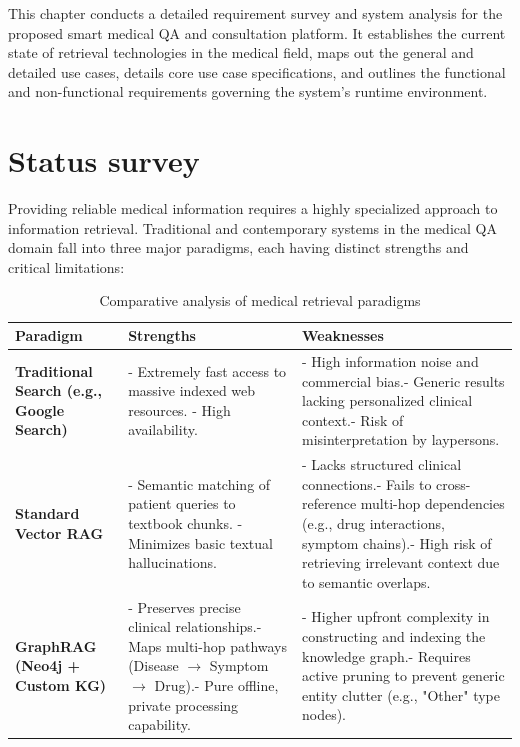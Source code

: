 \documentclass[../main.tex]{subfiles}
\begin{document}
This chapter conducts a detailed requirement survey and system analysis for the proposed smart medical QA and consultation platform. It establishes the current state of retrieval technologies in the medical field, maps out the general and detailed use cases, details core use case specifications, and outlines the functional and non-functional requirements governing the system's runtime environment.

\section{Status survey}
\label{section:2.1}
Providing reliable medical information requires a highly specialized approach to information retrieval. Traditional and contemporary systems in the medical QA domain fall into three major paradigms, each having distinct strengths and critical limitations:

\begin{table}[H]
\centering
\small
\setlength{\tabcolsep}{4pt}
\begin{tabular}{|p{2.8cm}|p{5.7cm}|p{5.7cm}|}
\hline
\textbf{Paradigm} & \textbf{Strengths} & \textbf{Weaknesses} \\ \hline
\textbf{Traditional Search (e.g., Google Search)} & - Extremely fast access to massive indexed web resources. \newline- High availability. & - High information noise and commercial bias.\newline- Generic results lacking personalized clinical context.\newline- Risk of misinterpretation by laypersons. \\ \hline
\textbf{Standard Vector RAG} & - Semantic matching of patient queries to textbook chunks. \newline- Minimizes basic textual hallucinations. & - Lacks structured clinical connections.\newline- Fails to cross-reference multi-hop dependencies (e.g., drug interactions, symptom chains).\newline- High risk of retrieving irrelevant context due to semantic overlaps. \\ \hline
\textbf{GraphRAG (Neo4j + Custom KG)} & - Preserves precise clinical relationships.\newline- Maps multi-hop pathways (Disease $\rightarrow$ Symptom $\rightarrow$ Drug).\newline- Pure offline, private processing capability. & - Higher upfront complexity in constructing and indexing the knowledge graph.\newline- Requires active pruning to prevent generic entity clutter (e.g., "Other" type nodes). \\ \hline
\end{tabular}
\caption{Comparative analysis of medical retrieval paradigms}
\label{table:retrieval_paradigms}
\end{table}
\end{document}
